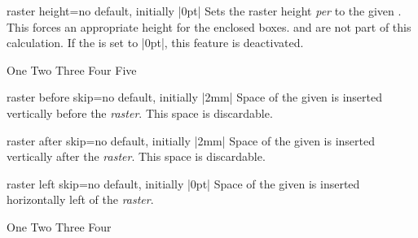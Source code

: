 \clearpage
\begin{docTcbKey}[][doc new=2014-11-10]{raster height}{=}{no default, initially |0pt|}
  Sets the raster height \emph{per}  to the given .
  This forces an appropriate height for the enclosed boxes.
   and 
  are not part of this calculation.
  If the  is set to |0pt|, this feature is deactivated.
\begin{dispExample}
\begin{tcbitemize}[raster height=4cm, raster rows=2,
  size=small,colframe=red!50!black,colback=red!10!white]
  \tcbitem One
  \tcbitem Two
  \tcbitem[enhanced,
    finish={\draw[blue,very thick,<->] (frame.south)
      -- node[right,pos=.75]{4cm} +(0,4); }]
    Three
  \tcbitem Four
  \tcbitem Five
\end{tcbitemize}
\end{dispExample}
\end{docTcbKey}


\begin{docTcbKey}[][doc new and updated={2014-11-10}{2014-12-16}]{raster before skip}{=}{no default, initially |2mm|}
  Space of the given  is inserted vertically before the \emph{raster}.
  This space is discardable.
\end{docTcbKey}

\begin{docTcbKey}[][doc new and updated={2014-11-10}{2014-12-16}]{raster after skip}{=}{no default, initially |2mm|}
  Space of the given  is inserted vertically after the \emph{raster}.
  This space is discardable.
\end{docTcbKey}


\clearpage

\begin{docTcbKey}[][doc new=2014-11-10]{raster left skip}{=}{no default, initially |0pt|}
  Space of the given  is inserted horizontally left of the \emph{raster}.
\begin{dispExample}
\begin{tcbitemize}[raster left skip=2cm,
  size=small,colframe=red!50!black,colback=red!10!white]
  \tcbitem One
  \tcbitem Two
  \tcbitem Three
  \tcbitem Four
\end{tcbitemize}
\end{dispExample}
\end{docTcbKey}


